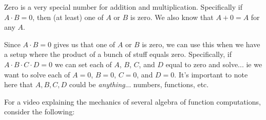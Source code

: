 \begin{hint}
    
    Zero is a very special number for addition and multiplication. Specifically if $A \cdot B = 0$, then (at least) one of $A$ or $B$ is zero. We also know that $A + 0 = A$ for any $A$.
    
    \begin{hint}
        
        Since $A \cdot B = 0$ gives us that one of $A$ or $B$ is zero, we can use this when we have a setup where the product of a bunch of stuff equals zero. Specifically, if $A\cdot B\cdot C\cdot D = 0$ we can set each of $A$, $B$, $C$, and $D$ equal to zero and solve... ie we want to solve each of $A = 0$, $B = 0$, $C = 0$, and $D = 0$. It's important to note here that $A,B,C,D$ could be \textit{anything}... numbers, functions, etc. 

        \begin{hint}
            For a video explaining the mechanics of several algebra of function computations, consider the following:
        \end{hint}
    \end{hint}
\end{hint}